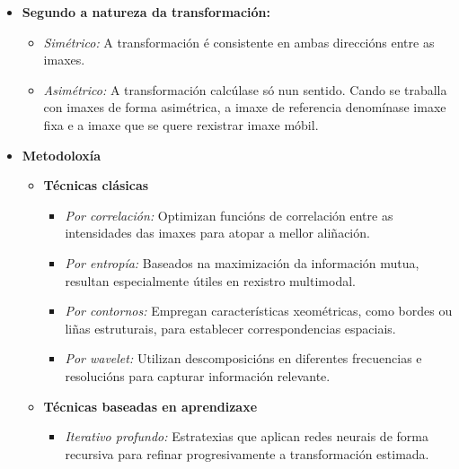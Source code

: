 \begin{itemize}
    \item \textbf{Segundo a natureza da transformación:}
    \begin{itemize}
        \item \textit{Simétrico:} A transformación é consistente en ambas direccións entre as imaxes.
        \item \textit{Asimétrico:} A transformación calcúlase só nun sentido. Cando se traballa con imaxes de forma asimétrica, a imaxe de referencia denomínase imaxe fixa e a imaxe que se quere rexistrar imaxe móbil.
    \end{itemize}

\end{itemize}

\begin{itemize}
    \item \textbf{Metodoloxía}
    \begin{itemize}
        \item \textbf{Técnicas clásicas} \cite{zitova2003imageregistrationsurvey}
        \begin{itemize}
            \item \textit{Por correlación:} Optimizan funcións de correlación entre as intensidades das imaxes para atopar a mellor aliñación.
            \item \textit{Por entropía:} Baseados na maximización da información mutua, resultan especialmente útiles en rexistro multimodal.
            \item \textit{Por contornos:} Empregan características xeométricas, como bordes ou liñas estruturais, para establecer correspondencias espaciais.
            \item \textit{Por wavelet:} Utilizan descomposicións en diferentes frecuencias e resolucións para capturar información relevante.
        \end{itemize}
        
        \item \textbf{Técnicas baseadas en aprendizaxe} \cite{deeplernreview3dreg, bharati2022deeplearningmedicalimage}
        \begin{itemize}
            \item \textit{Iterativo profundo:} Estratexias que aplican redes neurais de forma recursiva para refinar progresivamente a transformación estimada.
            

\end{itemize}
\end{itemize}
\end{itemize}

